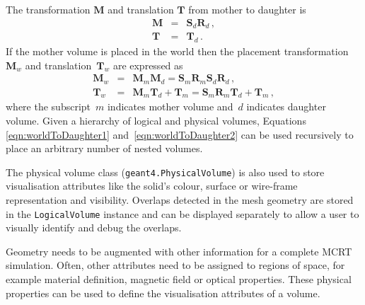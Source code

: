 \documentclass[final,5p,times,twocolumn]{elsarticle}
\newcommand{\pyinline}[1]{\lstinline[postbreak={}]{#1}}
\begin{document}
The transformation  $\mathbf{M}$  and translation $\mathbf{T}$ from mother to daughter is
\begin{eqnarray}
\mathbf{M} 	& = &  \mathbf{S}_d  \mathbf{R}_d\,, \\
\mathbf{T} 	& = &  \mathbf{T}_d\,.
\end{eqnarray}
%
If the mother volume is placed in the world then the placement transformation~$\mathbf{M}_w$ and translation~$\mathbf{T}_w$ are expressed as
\begin{eqnarray}
\mathbf{M}_w	  	& = & \mathbf{M}_m \mathbf{M}_d  = \mathbf{S}_m \mathbf{R}_m  \mathbf{S}_d \mathbf{R}_d\, ,				\label{eqn:worldToDaughter1}\\
\mathbf{T}	_w 		& = & \mathbf{M}_m \mathbf{T}_d + \mathbf{T}_m= \mathbf{S}_m \mathbf{R}_m \mathbf{T}_d + \mathbf{T}_m\,,  \label{eqn:worldToDaughter2}
\end{eqnarray}
where the subscript~$m$ indicates mother volume and~$d$ indicates daughter volume. Given a hierarchy of logical and physical volumes,
Equations \ref{eqn:worldToDaughter1} and~\ref{eqn:worldToDaughter2} can be used recursively to place an arbitrary number of nested volumes.

The physical volume class (\pyinline{geant4.PhysicalVolume}) is also used to store visualisation attributes like the solid's
colour, surface or wire-frame representation and visibility. Overlaps detected in the mesh geometry are
stored in the \pyinline{LogicalVolume} instance and can be  displayed separately to allow a user to visually identify and debug the overlaps.

Geometry needs to be augmented with other information for a complete MCRT simulation. Often, other attributes need to be
assigned to regions of space, for example material definition, magnetic field or optical properties. These physical properties
can be used to define the visualisation attributes of a volume.
\end{document}
